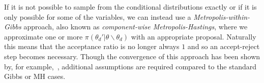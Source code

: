 If it is not possible to sample from the conditional distributions exactly or if it is only
possible for some of the variables, we can instead use a \emph{Metropolis-within-Gibbs} approach,
also known as \emph{component-wise Metropolis-Hastings}, where
we approximate one or more $\pi(\theta_d' | \theta \backslash \theta_d)$ with an
appropriate proposal.  Naturally this means that the acceptance ratio is no longer always $1$ and so
an accept-reject step becomes necessary.  Though the convergence of this approach has
been shown by, for example,~\cite{jones2014convergence}, additional assumptions are required compared to the
standard Gibbs or MH cases.
